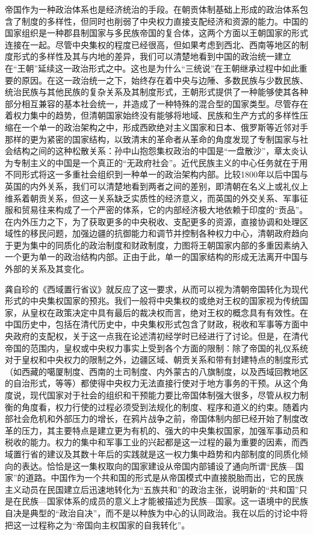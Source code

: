 \documentclass[a4paper, 12pt, openright]{ctexbook}
\begin{document}
帝国作为一种政治体系也是经济统治的手段。在朝贡体制基础上形成的政治体系包含了制度的多样性，但同时也削弱了中央权力直接支配经济和资源的能力。中国的国家组织是一种郡县制国家与多民族帝国的复合体，这两个方面以王朝国家的形式连接在一起。尽管中央集权的程度已经很高，但如果考虑到西北、西南等地区的制度形式的多样性及其与内地的差异，我们可以清楚地看到中国的政治统一建立在“王朝”延续这一政治形式之中。这也是为什么“三统说”在王朝继承过程中如此重要的原因。在这一政治统一之下，始终存在着中央与边陲、多数民族与少数民族、统治民族与其他民族的复杂关系及其制度形式，王朝形式提供了一种能够使其各种部分相互兼容的基本社会统一，并造成了一种特殊的混合型的国家类型。尽管存在着权力集中的趋势，但清朝国家始终没有能够将地域、民族和生产方式的多样性压缩在一个单一的政治架构之中，形成西欧绝对主义国家和日本、俄罗斯等近邻对手那样的更为紧密的国家结构，以致清末的革命者从革命的角度发现了专制国家与社会结构之间的这种松散关系：孙中山抱怨集权政治的中国是“一盘散沙”，章太炎认为专制主义的中国是一个真正的“无政府社会”。近代民族主义的中心任务就在于用不同形式将这一多重社会组织到一种单一的政治架构内部。比较1800年以后中国与英国的内外关系，我们可以清楚地看到两者之间的差别，即清朝在名义上或礼仪上维系着朝贡关系，但这一关系缺乏实质性的经济意义，而英国的外交关系、军事征服和贸易往来构成了一个严密的体系，它的内部经济极大地依赖于印度的“贡品”。在内外压力之下，为了获取更多的中央税收、支配更多的资源，直接协调和处理区域性的移民问题，加强边疆的抗御能力和调节并控制各种权力中心，清朝政府趋向于更为集中的同质化的政治制度和财政制度，力图将王朝国家内部的多重因素纳入一个更为单一的政治结构内部。正由于此，单一的国家结构的形成无法离开中国与外部的关系及其变化。

龚自珍的《西域置行省议》就反应了这一要求，从而可以视为清朝帝国转化为现代形式的中央集权国家的预兆。我们一般将中央集权的或绝对王权的国家视为传统国家，从皇权在政策决定中具有最后的裁决权而言，绝对王权的概念具有有效性。在中国历史中，包括在清代历史中，中央集权形式包含了财政，税收和军事等方面中央政府的支配权，关于这一点我在论述清初经学时已经进行了讨论。但是，在清代帝国的范围内，皇权或中央权力事实上受到各个方面的限制：除了帝国的礼仪系统对于皇权和中央权力的限制之外，边疆区域、朝贡关系和带有封建特点的制度形式（如西藏的噶厦制度、西南的土司制度、内外蒙古的八旗制度，以及西域回教地区的自治形式，等等）都使得中央权力无法直接行使对于地方事务的干预。从这个角度说，现代国家对于社会的组织和干预能力要比帝国体制强大很多，尽管从权力制衡的角度看，权力行使的过程必须受到法规化的制度、程序和道义的约束。随着内部社会危机和外部压力的增长，在鸦片战争之前，帝国体制内部已经开始了制度改革的压力，其主要特点是建立更为有机的、强大的中央集权国家，加强军事动员和税收的能力。权力的集中和军事工业的兴起都是这一过程的最为重要的因素，而西域置行省的建议及其数十年后的实践就是这一权力集中趋势和内部制度的同质化倾向的表达。恰恰是这一集权取向的国家建设从帝国内部铺设了通向所谓“民族—国家”的道路。中国作为一个共和国的形式是从帝国模式中直接脱胎而出，它的民族主义动员在民国建立后迅速地转化为“五族共和”的政治主张，说明新的“共和国”只是在民族—国家体系的成员的意义上才能被描述为民族—国家。这一语境中的民族自决是典型的“政治自决”，而不是以种族为中心的认同政治。我在以后的讨论中将把这一过程称之为“帝国向主权国家的自我转化”。
\end{document}
